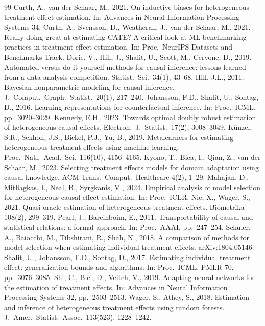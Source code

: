\documentclass[pdflatex,sn-mathphys-num]{sn-jnl}
\begin{document}
\begin{thebibliography}{99}
 Curth, A., van der Schaar, M., 2021. On inductive biases for heterogeneous treatment effect estimation. In: Advances in Neural Information Processing Systems 34.
 Curth, A., Svensson, D., Weatherall, J., van der Schaar, M., 2021. Really doing great at estimating CATE? A critical look at ML benchmarking practices in treatment effect estimation. In: Proc.\ NeurIPS Datasets and Benchmarks Track.
 Dorie, V., Hill, J., Shalit, U., Scott, M., Cervone, D., 2019. Automated versus do-it-yourself methods for causal inference: lessons learned from a data analysis competition. Statist.\ Sci.\ 34(1), 43--68.
 Hill, J.L., 2011. Bayesian nonparametric modeling for causal inference. J.\ Comput.\ Graph.\ Statist.\ 20(1), 217--240.
 Johansson, F.D., Shalit, U., Sontag, D., 2016. Learning representations for counterfactual inference. In: Proc.\ ICML, pp.\ 3020--3029.
 Kennedy, E.H., 2023. Towards optimal doubly robust estimation of heterogeneous causal effects. Electron.\ J.\ Statist.\ 17(2), 3008--3049.
 K\"unzel, S.R., Sekhon, J.S., Bickel, P.J., Yu, B., 2019. Metalearners for estimating heterogeneous treatment effects using machine learning. Proc.\ Natl.\ Acad.\ Sci.\ 116(10), 4156--4165.
 Kyono, T., Bica, I., Qian, Z., van der Schaar, M., 2023. Selecting treatment effects models for domain adaptation using causal knowledge. ACM Trans.\ Comput.\ Healthcare 4(2), 1--29.
 Mahajan, D., Mitliagkas, I., Neal, B., Syrgkanis, V., 2024. Empirical analysis of model selection for heterogeneous causal effect estimation. In: Proc.\ ICLR.
 Nie, X., Wager, S., 2021. Quasi-oracle estimation of heterogeneous treatment effects. Biometrika 108(2), 299--319.
 Pearl, J., Bareinboim, E., 2011. Transportability of causal and statistical relations: a formal approach. In: Proc.\ AAAI, pp.\ 247--254.
 Schuler, A., Baiocchi, M., Tibshirani, R., Shah, N., 2018. A comparison of methods for model selection when estimating individual treatment effects. arXiv:1804.05146.
 Shalit, U., Johansson, F.D., Sontag, D., 2017. Estimating individual treatment effect: generalization bounds and algorithms. In: Proc.\ ICML, PMLR 70, pp.\ 3076--3085.
 Shi, C., Blei, D., Veitch, V., 2019. Adapting neural networks for the estimation of treatment effects. In: Advances in Neural Information Processing Systems 32, pp.\ 2503--2513.
 Wager, S., Athey, S., 2018. Estimation and inference of heterogeneous treatment effects using random forests. J.\ Amer.\ Statist.\ Assoc.\ 113(523), 1228--1242.
\end{thebibliography}
\end{document}
